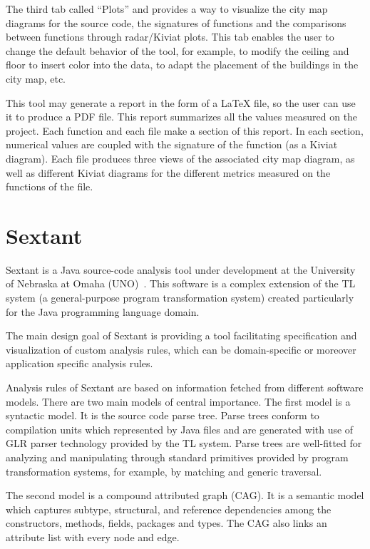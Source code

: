 The third tab called “Plots” and provides a way to visualize the city map diagrams for the source code, the signatures of functions and the comparisons between functions through radar/Kiviat plots. This tab enables the user to change the default behavior of the tool, for example, to modify the ceiling and floor to insert color into the data, to adapt the placement of the buildings in the city map, etc. 

This tool may generate a report in the form of a LaTeX file, so the user can use it to produce a PDF file. This report summarizes all the values measured on the project. Each function and each file make a section of this report. In each section, numerical values are coupled with the signature of the function (as a Kiviat diagram). Each file produces three views of the associated city map diagram, as well as different Kiviat diagrams for the different metrics measured on the functions of the file. 

\section{Sextant}

Sextant is a Java source-code analysis tool under development at the University of Nebraska at Omaha (UNO)~\cite{sextant}. This software is a complex extension of the TL system (a general-purpose program transformation system) created particularly for the Java programming language domain.

The main design goal of Sextant is providing a tool facilitating specification and visualization of custom analysis rules, which can be domain-specific or moreover application specific analysis rules.

Analysis rules of Sextant are based on information fetched from different software models. There are two main models of central importance. The first model is a syntactic model. It is the source code parse tree. Parse trees conform to compilation units which represented by Java files and are generated with use of GLR parser technology provided by the TL system. Parse trees are well-fitted for analyzing and manipulating through standard primitives provided by program transformation systems, for example, by matching and generic traversal.

The second model is a compound attributed graph (CAG). It is a semantic model which captures subtype, structural, and reference dependencies among the constructors, methods, fields, packages and types. The CAG also links an attribute list with every node and edge.

